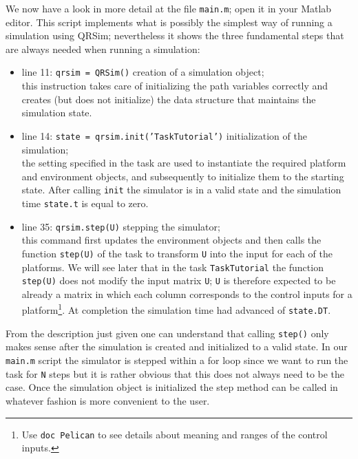 \documentclass[a4paper,11pt]{article}
\begin{document}
We now have a look in more detail at the file \texttt{main.m}; open it in your Matlab editor. 
This script implements what is possibly the simplest way of running a simulation using QRSim; nevertheless it shows the three fundamental steps that are always needed when running a simulation:
\begin{itemize}
 \item line 11: \texttt{qrsim = QRSim()}  creation of a simulation object; \\
  this instruction takes care of initializing the path variables correctly and creates (but does not initialize) the data structure that maintains the simulation state. 
 \item line 14: \texttt{state = qrsim.init('TaskTutorial')} initialization of the simulation;\\
  the setting specified in the task are used to instantiate the required platform and environment objects, and subsequently to initialize them to the starting state. After calling \texttt{init} the simulator is in a valid state and the simulation time \texttt{state.t} is equal to zero.
 \item line 35: \texttt{qrsim.step(U)} stepping the simulator;\\
 this command first updates the environment objects and then calls the function \texttt{step(U)} of the task to transform \texttt{U} into the input for each of the platforms. We will see later that in the task \texttt{TaskTutorial} the function \texttt{step(U)} does not modify the input matrix \texttt{U}; \texttt{U} is therefore expected to be already a matrix in which each column corresponds to the control inputs for a platform\footnote{Use \texttt{doc Pelican} to see details about meaning and ranges of the control inputs.}. At completion the simulation time had advanced of \texttt{state.DT}.  
\end{itemize}
From the description just given one can understand that calling \texttt{step()} only makes sense after the simulation is created and initialized to a valid state. 
In our \texttt{main.m} script the simulator is stepped within a for loop since we want to run the task for \texttt{N} steps but it is rather obvious that this does not always need to be the case. Once the simulation object is initialized the step method can be called in whatever fashion is more convenient to the user.
\end{document}
